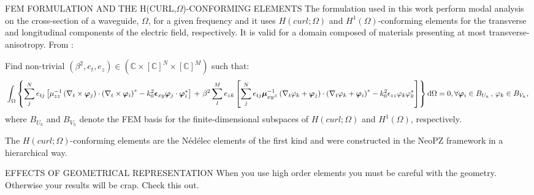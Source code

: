 \documentclass[debug]{beamer} %
\def\\{ }%
\newcommand{\hcurl}[1]{H (curl;#1)}
\newcommand{\hone}[1]{H^1(#1)}
\newcommand{\testhcurl}[0]{\bm{\varphi}}
\newcommand{\testhone}[0]{\varphi}
\begin{document}
\begin{frame}
\begin{columns}
\begin{column}{0.45\textwidth}
{        \vfill
        \begin{block}{\boxnumber FEM FORMULATION AND THE \texorpdfstring{H(CURL,$\Omega$)}{H(CURL,OMEGA)}-CONFORMING ELEMENTS}
        The formulation used in this work perform modal analysis on the cross-section of a waveguide, $\Omega$, for a given frequency and it uses $\hcurl{\Omega}$ and $\hone{\Omega}$-conforming elements for the transverse and longitudinal components of the electric field, respectively. It is valid for a domain composed of materials presenting at most transverse-anisotropy. From \textcite{jin14}:

	        Find non-trivial $\left(\beta^2,{e_t}, {e_z}\right) \in (\mathbb{C} \times [\mathbb{C}]^N \times [\mathbb{C}]^M)$ such that:
			\begin{equation}
				\renewcommand{\arraystretch}{1.5}%
	  			 \scalebox{0.9}{%
					$\begin{multlined}\label{eq:fem-hcurl-disc-1}
					    \int_\Omega\left\{\sum_{j}^Ne_{tj}\left[\mu_{zz}^{-1} \left( \nabla_t \times \testhcurl_j \right)\cdot \left( \nabla_t \times \testhcurl_i \right)^*- k_0^2 \bm{\epsilon}_{xy}\testhcurl_j\cdot\testhcurl_i^*\right]\right.\\
					     +\left.\beta^2\sum_{l}^M e_{zk} \left[ \sum_{j}^Ne_{tj} \bm{\mu}_{xy^S}^{-1} \left( \nabla_t \testhone_k +\testhcurl_j \right)\cdot \left(\nabla_t \testhone_k +\testhcurl_i \right)^*-k_0^2\epsilon_{zz} \testhone_k\testhone_k^*\right]\right\}\mathrm{d}\Omega = 0,\\
					     \forall \testhcurl_i \in B_{U_h}\,,\, \testhone_k \in B_{V_h}\text{,}
					\end{multlined}$
				}
			\end{equation}%
			where $B_{U_h}$ and $B_{V_h}$ denote the FEM basis for the finite-dimensional subspaces of $\hcurl{\Omega}$ and $\hone{\Omega}$, respectively.

			The  $\hcurl{\Omega}$-conforming elements are the Nédélec elements of the first kind \textcite{nedelec80} and were constructed in the NeoPZ framework in a hierarchical way.
        \end{block}

        \vfill
        \begin{block}{\boxnumber EFFECTS OF GEOMETRICAL REPRESENTATION}
        	When you use high order elements you must be careful with the geometry. Otherwise your results will be crap. Check this out.


\end{block}}
\end{column}
\end{columns}
\end{frame}
\end{document}
